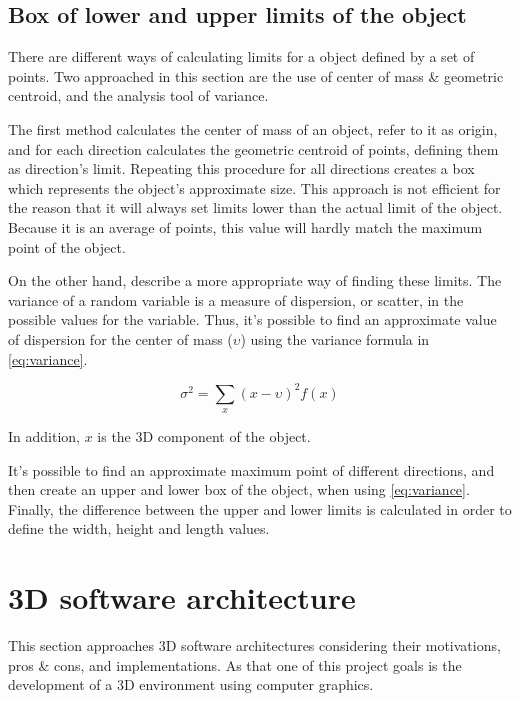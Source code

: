     
\subsection{Box of lower and upper limits of the object}

    There are different ways of calculating limits for a object defined by a set of points. Two approached in this section are the use of center of mass \& geometric centroid, and the analysis tool of variance.

    The first method calculates the center of mass of an object, refer to it as origin, and for each direction calculates the geometric centroid of points, defining them as direction's limit. Repeating this procedure for all directions creates a box which represents the object's approximate size. This approach is not efficient for the reason that it will always set limits lower than the actual limit of the object. Because it is an average of points, this value will hardly match the maximum point of the object.

    On the other hand, \cite{estatistic-douglas} describe a more appropriate way of finding these limits. The variance of a random variable is a measure of dispersion, or scatter, in the possible values for the variable. Thus, it's possible to find an approximate value of dispersion for the center of mass (\(\upsilon\)) using the variance formula in \autoref{eq:variance}.

    \begin{equation}\label{eq:variance}
    \sigma^{2} = \sum_{x}(x-\upsilon)^{2}f(x) 
    \end{equation}

    In addition, \(x\) is the 3D component of the object. 
    
    It's possible to find an approximate maximum point of different directions, and then create an upper and lower box of the object, when using \autoref{eq:variance}. Finally, the difference between the upper and lower limits is calculated in order to define the width, height and length values.


\section{3D software architecture}

    This section approaches 3D software architectures considering their motivations, pros \& cons, and implementations. As that one of this project goals is the development of a 3D environment using computer graphics.
    
